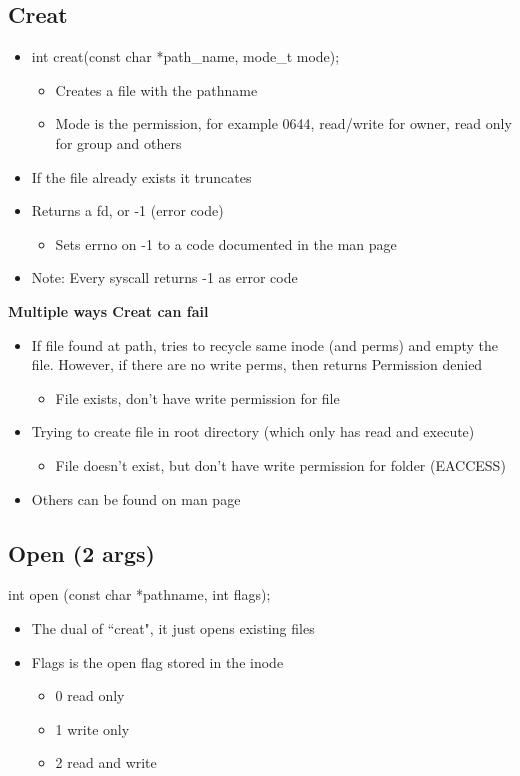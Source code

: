 \subsection{Creat}
\begin{itemize}
    \item int creat(const char *path\_name, mode\_t mode);
    \begin{itemize}
        \item Creates a file with the pathname
        \item Mode is the permission, for example 0644, read/write for owner, read only for group and others
    \end{itemize}
    \item If the file already exists it truncates
    \item Returns a fd, or -1 (error code)
    \begin{itemize}
        \item Sets errno on -1 to a code documented in the man page
    \end{itemize}
    \item Note: Every syscall returns -1 as error code
\end{itemize}
\textbf{Multiple ways Creat can fail}
\begin{itemize}
    \item If file found at path, tries to recycle same inode (and perms) and empty the file. However, if there are no write perms, then returns Permission denied
    \begin{itemize}
        \item File exists, don't have write permission for file
    \end{itemize}
    \item Trying to create file in root directory (which only has read and execute)
    \begin{itemize}
        \item File doesn't exist, but don't have write permission for folder (EACCESS)
    \end{itemize}
    \item Others can be found on man page
\end{itemize}

\subsection{Open (2 args)}
int open (const char *pathname, int flags);
\begin{itemize}
    \item The dual of ``creat", it just opens existing files
    \item Flags is the open flag stored in the inode
    \begin{itemize}
        \item 0 read only
        \item 1 write only
        \item 2 read and write
    \end{itemize}
\end{itemize}
